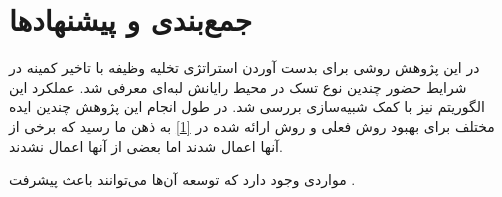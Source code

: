 \chapter{جمع‌بندی و پیشنهاد‌ها}
در این پژوهش روشی برای بدست آوردن استراتژی تخلیه وظیفه با تاخیر کمینه در شرایط حضور چندین نوع تسک در محیط رایانش لبه‌ای معرفی شد. عملکرد این الگوریتم نیز با کمک شبیه‌سازی بررسی شد. در طول انجام این پژوهش چندین ایده مختلف برای بهبود روش فعلی و روش ارائه شده در \ref{1} به ذهن ما رسید که برخی از آنها اعمال شدند اما بعضی از آنها اعمال نشدند.

مواردی وجود دارد که توسعه آن‌ها می‌توانند باعث پیشرفت .
\clearpage